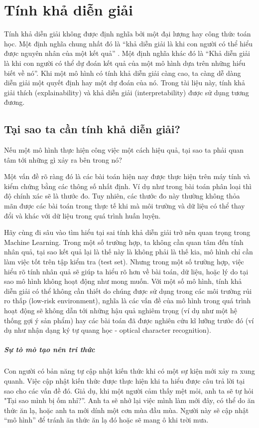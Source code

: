 \chapter{Tính khả diễn giải}
Tính khả diễn giải không được định nghĩa bởi một đại lượng hay công thức toán học. Một định nghĩa chung nhất đó là ``khả diễn giải là khi con người có thể hiểu được nguyên nhân của một kết quả'' . Một định nghĩa khác đó là ``Khả diễn giải là khi con người có thể dự đoán kết quả của một mô hình dựa trên những hiểu biết về nó''. Khi một mô hình có tính khả diễn giải càng cao, ta càng dễ dàng diễn giải một quyết định hay một dự đoán của nó. Trong tài liệu này, tính khả giải thích (explainability) và khả diễn giải (interpretability) được sử dụng tương đương.

\clearpage

\section{Tại sao ta cần tính khả diễn giải?}
Nếu một mô hình thực hiện công việc một cách hiệu quả, tại sao ta phải quan tâm tới những gì xảy ra bên trong nó? 

Một vấn đề rõ ràng đó là các bài toán hiện nay được thực hiện trên máy tính và kiểm chứng bằng các thông số nhất định. Ví dụ như trong bài toán phân loại thì độ chính xác sẽ là thước đo. Tuy nhiên, các thước đo này thường không thỏa mãn được các bài toán trong thực tế khi mà môi trường và dữ liệu có thể thay đổi và khác với dữ liệu trong quá trình huấn luyện.

Hãy cùng đi sâu vào tìm hiểu tại sai tính khả diễn giải trở nên quan trọng trong Machine Learning. Trong một số trường hợp, ta không cần quan tâm đến tính nhân quả, tại sao kết quả lại là thế này là không phải là thế kia, mô hình chỉ cần làm việc tốt trên tập kiểm tra (test set). Nhưng trong một số trường hợp, việc hiểu rõ tính nhân quả sẽ giúp ta hiểu rõ hơn về bài toán, dữ liệu, hoặc lý do tại sao mô hình không hoạt động như mong muốn. Với một số mô hình, tính khả diễn giải có thể không cần thiết do chúng được sử dụng trong các môi trường rủi ro thấp (low-risk environment), nghĩa là các vấn đề của mô hình trong quá trình hoạt động sẽ không dẫn tới những hậu quả nghiêm trọng (ví dụ như một hệ thống gợi ý sản phẩm) hay các bài toán đã được nghiên cứu kĩ lưỡng trước đó (ví dụ như nhận dạng ký tự quang học - optical character recognition).

\paragraph{Sự tò mò tạo nên tri thức} Con người có bản năng tự cập nhật kiến thức khi có một sự kiện mới xảy ra xung quanh. Việc cập nhật kiến thức được thực hiện khi ta hiểu được câu trả lời tại sao cho các vấn đề đó. Giả dụ, khi một người cảm thấy mệt mỏi, anh ta sẽ tự hỏi "Tại sao mình bị ốm nhỉ?''. Anh ta sẽ nhớ lại việc mình làm mới đây, có thể do ăn thức ăn lạ, hoặc anh ta mới dính một cơn mùa đầu mùa. Người này sẽ cập nhật ``mô hình'' để tránh ăn thức ăn lạ đó hoặc sẽ mang ô khi trời mưa.

